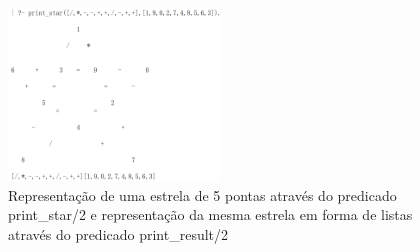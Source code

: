 \begin{figure}[h!]
\centering
\includegraphics[width=0.5\textwidth]{figuras/representações.png}
\caption{Representação de uma estrela de 5 pontas através do predicado print\_star/2 e representação da mesma estrela em forma de listas através do predicado print\_result/2}
\label{fig: representacoes}
\end{figure}